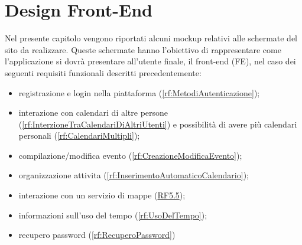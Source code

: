 \section{Design Front-End}
\label{sec:RequisitiFrontEnd}

Nel presente capitolo vengono riportati alcuni mockup relativi alle schermate del sito da realizzare. Queste schermate hanno l'obiettivo di rappresentare come l'applicazione si dovrà presentare all'utente finale, il front-end (FE), nel caso dei seguenti requisiti funzionali descritti precedentemente:
\begin{itemize}
	\item registrazione e login nella piattaforma (\ref{rf:MetodiAutenticazione});
	\item interazione con calendari di altre persone (\ref{rf:InterzioneTraCalendariDiAltriUtenti}) e possibilità di avere più calendari personali (\ref{rf:CalendariMultipli});
	\item compilazione/modifica evento (\ref{rf:CreazioneModificaEvento});
	\item organizzazione attivita (\ref{rf:InserimentoAutomaticoCalendario});
	\item interazione con un servizio di mappe (\hyperref[rf:LuogoEvento]{RF5.5});
	\item informazioni sull'uso del tempo (\ref{rf:UsoDelTempo});
	\item recupero password (\ref{rf:RecuperoPassword}) %
\end{itemize}

